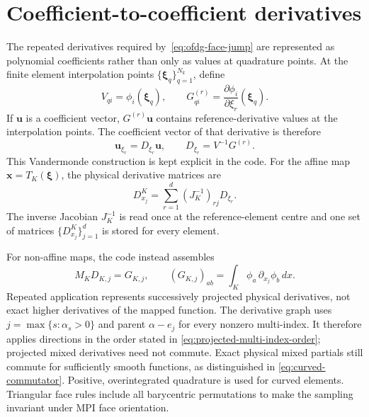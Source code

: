 \section{Coefficient-to-coefficient derivatives}

The repeated derivatives required by~\eqref{eq:ofdg-face-jump} are represented as
polynomial coefficients rather than only as values at quadrature points.  At the
finite element interpolation points $\{\boldsymbol{\xi}_q\}_{q=1}^{N_k}$, define
\begin{equation}
  V_{qi}=\phi_i(\boldsymbol{\xi}_q),
  \qquad
  G_{qi}^{(r)}
  =\frac{\partial\phi_i}{\partial\xi_r}(\boldsymbol{\xi}_q).
\end{equation}
If $\boldsymbol{u}$ is a coefficient vector, $G^{(r)}\boldsymbol{u}$ contains
reference-derivative values at the interpolation points.  The coefficient vector
of that derivative is therefore
\begin{equation}
  \boldsymbol{u}_{\xi_r}=D_{\xi_r}\boldsymbol{u},
  \qquad
  D_{\xi_r}=V^{-1}G^{(r)}.
  \label{eq:ofdg-reference-derivative-matrix}
\end{equation}
This Vandermonde construction is kept explicit in the code.  For the affine map
$\boldsymbol{x}=T_K(\boldsymbol{\xi})$, the physical derivative matrices are
\begin{equation}
  D_{x_j}^{K}
  =\sum_{r=1}^d(J_K^{-1})_{rj}D_{\xi_r}.
  \label{eq:ofdg-physical-derivative-matrix}
\end{equation}
The inverse Jacobian $J_K^{-1}$ is read once at the reference-element centre and
one set of matrices $\{D_{x_j}^{K}\}_{j=1}^d$ is stored for every element.

For non-affine maps, the code instead assembles
\begin{equation}
  M_K D_{K,j}=G_{K,j},\qquad
  (G_{K,j})_{ab}=\int_K\phi_a\,\partial_{x_j}\phi_b\,dx.
\end{equation}
Repeated application represents successively projected physical derivatives,
not exact higher derivatives of the mapped function.  The derivative graph
uses $j=\max\{s:\alpha_s>0\}$ and parent $\alpha-e_j$ for every
nonzero multi-index. It therefore applies directions in the order stated in
\cref{eq:projected-multi-index-order}; projected mixed derivatives need not
commute. Exact physical mixed partials still commute for sufficiently smooth
functions, as distinguished in \cref{eq:curved-commutator}.
Positive, overintegrated quadrature is used for curved elements.  Triangular
face rules include all barycentric permutations to make the sampling invariant
under MPI face orientation.

